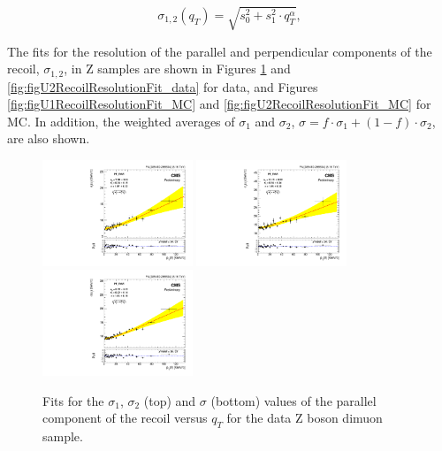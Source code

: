 \begin{equation}\label{eq:equreolnparam} 
\sigma_{1,2}(q_{T}) = \sqrt{s_{0}^{2} + s_{1}^{2} \cdot q_{T}^{\alpha}},
\end{equation}

The fits for the resolution of the parallel and perpendicular components of the recoil, $\sigma_{1,2}$, in Z samples are shown in Figures \ref{fig:figU1RecoilResolutionFit_data}  and \ref{fig:figU2RecoilResolutionFit_data} for data, and Figures \ref{fig:figU1RecoilResolutionFit_MC} and \ref{fig:figU2RecoilResolutionFit_MC} for MC. In addition, the weighted averages of $\sigma_{1}$ and  $\sigma_{2}$, $\sigma = f \cdot \sigma_{1} + (1 - f) \cdot \sigma_{2}$, are also shown.

\begin{figure} [h!]
\begin{center}
\includegraphics[width=0.4\textwidth]{Figures/WBoson/Analysis/Correction/Recoil/RecoilFitsqT/Data/fitPFu1sigma1.pdf}
\includegraphics[width=0.4\textwidth]{Figures/WBoson/Analysis/Correction/Recoil/RecoilFitsqT/Data/fitPFu1sigma2.pdf} \\
\includegraphics[width=0.4\textwidth]{Figures/WBoson/Analysis/Correction/Recoil/RecoilFitsqT/Data/fitPFu1sigma.pdf}
\caption{Fits for the $\sigma_{1}$,  $\sigma_{2}$ (top) and $\sigma$ (bottom) values of the parallel component of the recoil versus $q_{T}$ for the data Z boson dimuon sample.}
\label{fig:figU1RecoilResolutionFit_data}
\end{center}
\end{figure}

